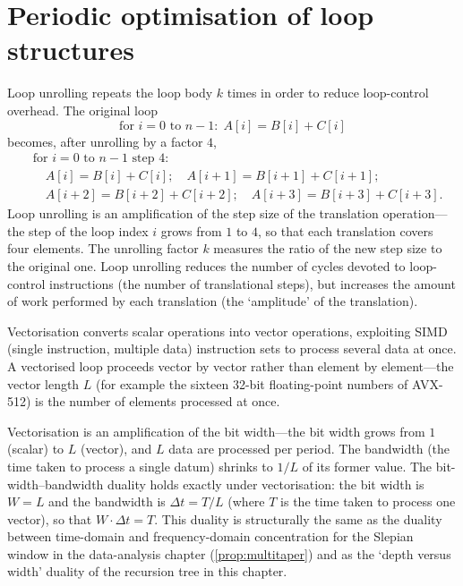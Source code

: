 \section{Periodic optimisation of loop structures}

\begin{definition}\label{def:loop_unrolling}
Loop unrolling repeats the loop body $k$ times in order to reduce loop-control overhead. The original loop
\[
\text{for } i = 0 \text{ to } n-1: \; A[i] = B[i] + C[i]
\]
becomes, after unrolling by a factor $4$,
\[
\begin{aligned}
&\text{for } i = 0 \text{ to } n-1 \text{ step } 4: \\
&\quad A[i] = B[i] + C[i]; \quad A[i+1] = B[i+1] + C[i+1]; \\
&\quad A[i+2] = B[i+2] + C[i+2]; \quad A[i+3] = B[i+3] + C[i+3].
\end{aligned}
\]
Loop unrolling is an amplification of the step size of the translation operation---the step of the loop index $i$ grows from $1$ to $4$, so that each translation covers four elements. The unrolling factor $k$ measures the ratio of the new step size to the original one. Loop unrolling reduces the number of cycles devoted to loop-control instructions (the number of translational steps), but increases the amount of work performed by each translation (the `amplitude' of the translation).
\end{definition}

\begin{definition}[Vectorisation]\label{def:vectorization}
Vectorisation converts scalar operations into vector operations, exploiting SIMD (single instruction, multiple data) instruction sets to process several data at once. A vectorised loop proceeds vector by vector rather than element by element---the vector length $L$ (for example the sixteen 32-bit floating-point numbers of AVX-512) is the number of elements processed at once.

Vectorisation is an amplification of the bit width---the bit width grows from $1$ (scalar) to $L$ (vector), and $L$ data are processed per period. The bandwidth (the time taken to process a single datum) shrinks to $1/L$ of its former value. The bit-width--bandwidth duality holds exactly under vectorisation: the bit width is $W = L$ and the bandwidth is $\Delta t = T/L$ (where $T$ is the time taken to process one vector), so that $W \cdot \Delta t = T$. This duality is structurally the same as the duality between time-domain and frequency-domain concentration for the Slepian window in the data-analysis chapter (\cref{prop:multitaper}) and as the `depth versus width' duality of the recursion tree in this chapter.
\end{definition}

